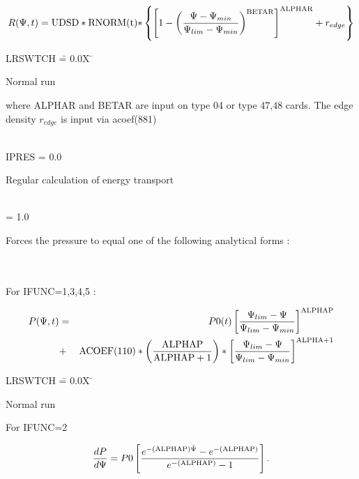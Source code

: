 \begin{equation}
\label{eq:dens} 
R( \Psi ,t) = {\rm UDSD*RNORM(t)*}  \left\{     \left [ 1- \left ( \frac{\Psi-\Psi_{min}}{\Psi_{lim}
-\Psi_{min}} \right ) ^{\rm BETAR} \right ] ^{\rm ALPHAR} + r_{edge} \right\}
\end{equation} 
\begin{tabbing}
\label{eq:pres} 
LRSWTCH \= = 0.0X \= \parbox[t]{\width}{ Normal run } \kill 
      \>       \> \parbox[t]{\width}{ where ALPHAR and BETAR are input on type 04 or type
47,48 cards. The edge density $r_{edge}$ is input via acoef(881)} \\ 
IPRES \> = 0.0 \> \parbox[t]{\width}{ Regular calculation of energy transport} \\ 
           \> = 1.0 \> \parbox[t]{\width}{ Forces the pressure to equal one of the following
analytical forms :} \\ 
      \>       \> \\ 
      \>       \> For IFUNC=1,3,4,5 : 
\end{tabbing}  
\begin{eqnarray} 
P(\Psi,t) & = & P0(t) \left [ \frac{\Psi_{lim} -\Psi}{\Psi_{lim}-\Psi_{min}} \right ] ^{\rm ALPHAP} \\ 
 &+& {\rm ACOEF(110)*\left( \frac{ALPHAP}{ALPHAP+1} \right)}*\left[ \frac{\Psi_{lim}-\Psi}{\Psi_{lim}-\Psi_{min}} \right]^{\rm ALPHA +1} 
\end{eqnarray} 
\begin{tabbing} 
LRSWTCH \= = 0.0X \= \parbox[t]{\width}{ Normal run } \kill 
\>       \> For IFUNC=2 
\end{tabbing} 
\begin{equation} 
\frac {dP}{d\Psi} = P0 \left [ \frac {e^{-(\rm ALPHAP)\hat{\Psi}} - e^{-(\rm
ALPHAP)}}{e^{-(\rm
ALPHAP)} -1} \right ] . 
\end{equation} 
